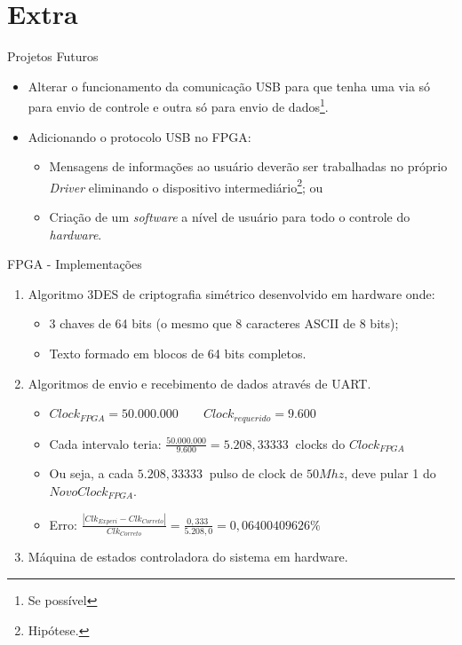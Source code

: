 
\section*{Extra}

	\begin{frame}{Projetos Futuros}
		\begin{itemize}
			\item Alterar o funcionamento da comunicação USB para que tenha uma via só para envio de controle e outra só para envio de dados\footnote{Se possível}.
			\item Adicionando o protocolo USB no FPGA:
			\begin{itemize}
				\item Mensagens de informações ao usuário deverão ser trabalhadas no próprio \textit{Driver} eliminando o dispositivo intermediário\footnote{Hipótese.}; ou
				\item Criação de um \textit{software} a nível de usuário para todo o controle do \textit{hardware}.
			\end{itemize}  
		\end{itemize}
	\end{frame}




		\begin{frame}{FPGA -  Implementações}
			\begin{enumerate}
				\item Algoritmo 3DES de criptografia simétrico desenvolvido em hardware onde:
				\begin{itemize}
					\item 3 chaves de 64 bits (o mesmo que 8 caracteres ASCII de 8 bits);
					\item Texto formado em blocos de 64 bits completos.
				\end{itemize}
				\item Algoritmos de envio e recebimento de dados através de UART.
				\begin{itemize}
  					\setlength\itemsep{.8em}
					\item $Clock_{FPGA} = 50.000.000 \quad\quad Clock_{requerido} = 9.600 $
					\item Cada intervalo teria: $\frac{50.000.000}{9.600} = 5.208,33333~$ clocks do $Clock_{FPGA}$
					\item Ou seja, a cada $ 5.208,33333~$ pulso de clock de $50Mhz$, deve pular 1 do $ NovoClock_{FPGA} $.
					\item Erro: $\frac{|Clk_{Experi} - Clk_{Correto}|}{Clk_{Correto}} = \frac{0,333~}{5.208,0} = 0,06400409626\% $
				\end{itemize}
				\item Máquina de estados controladora do sistema em hardware.
			\end{enumerate}
		\end{frame}



